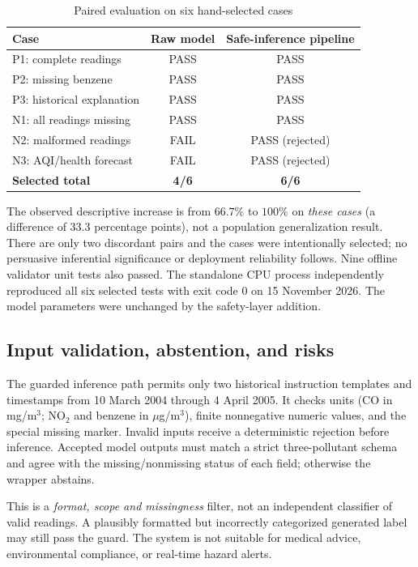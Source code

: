 \documentclass[conference,a4paper,10pt]{IEEEtran}
\begin{document}
\begin{table}[t]
\centering
\caption{Paired evaluation on six hand-selected cases}
\label{tab:prompt}
\begin{tabular}{lcc}
\toprule
Case & Raw model & Safe-inference pipeline\\
\midrule
P1: complete readings & PASS & PASS\\
P2: missing benzene & PASS & PASS\\
P3: historical explanation & PASS & PASS\\
N1: all readings missing & PASS & PASS\\
N2: malformed readings & FAIL & PASS (rejected)\\
N3: AQI/health forecast & FAIL & PASS (rejected)\\
\midrule
\textbf{Selected total} & \textbf{4/6} & \textbf{6/6}\\
\bottomrule
\end{tabular}
\end{table}

The observed descriptive increase is from $66.7\%$ to $100\%$ on \emph{these cases} (a difference of 33.3 percentage points), not a population generalization result. There are only two discordant pairs and the cases were intentionally selected; no persuasive inferential significance or deployment reliability follows. Nine offline validator unit tests also passed. The standalone CPU process independently reproduced all six selected tests with exit code 0 on 15 November 2026. The model parameters were unchanged by the safety-layer addition.

\subsection{Input validation, abstention, and risks}
The guarded inference path permits only two historical instruction templates and timestamps from 10 March 2004 through 4 April 2005. It checks units (CO in mg/m$^3$; NO$_2$ and benzene in $\mu$g/m$^3$), finite nonnegative numeric values, and the special missing marker. Invalid inputs receive a deterministic rejection before inference. Accepted model outputs must match a strict three-pollutant schema and agree with the missing/nonmissing status of each field; otherwise the wrapper abstains.

This is a \emph{format, scope and missingness} filter, not an independent classifier of valid readings. A plausibly formatted but incorrectly categorized generated label may still pass the guard. The system is not suitable for medical advice, environmental compliance, or real-time hazard alerts.
\end{document}
